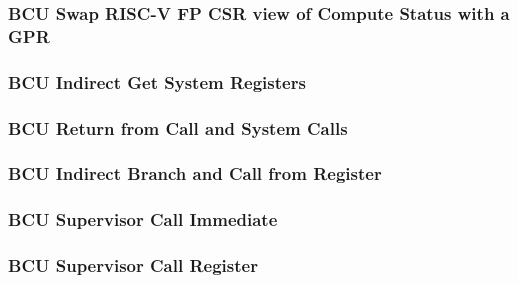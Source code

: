 \subsubsection[{\small BCU Swap RISC-V FP CSR view of Compute Status with a GPR}]{BCU Swap RISC-V FP CSR view of Compute Status with a GPR} \label{sec:format-BCU-FCSRSW}



\subsubsection[{\small BCU Indirect Get System Registers}]{BCU Indirect Get System Registers} \label{sec:format-BCU-IGSR}



\subsubsection[{\small BCU Return from Call and System Calls}]{BCU Return from Call and System Calls} \label{sec:format-BCU-RTS}



\subsubsection[{\small BCU Indirect Branch and Call from Register}]{BCU Indirect Branch and Call from Register} \label{sec:format-BCU-IBC}



\subsubsection[{\small BCU Supervisor Call Immediate}]{BCU Supervisor Call Immediate} \label{sec:format-BCU-SCI}



\subsubsection[{\small BCU Supervisor Call Register}]{BCU Supervisor Call Register} \label{sec:format-BCU-SCR}

